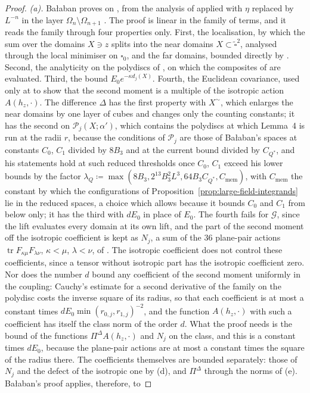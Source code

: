 \documentclass[11pt]{preprint}
\newcommand{\tr}{\operatorname{tr}}
\numberwithin{equation}{section}
\theoremstyle{definition}
\theoremstyle{remark}
\theoremstyle{plain}
\begin{document}
\begin{proof}
\emph{(a).} Ba{\l}aban proves \cite[(2.43)]{BalabanCRE} on \cite[pp.~279--283]{BalabanCRE}, from the analysis of \cite[Sects.~3--4]{BalabanRG1} applied with $\eta$ replaced by $L^{-n}$ in the layer $\Omega_n \setminus \Omega_{n+1}$ \cite[p.~276, ll.~2--16; p.~280, ll.~14--22]{BalabanCRE}. The proof is linear in the family of terms, and it reads the family through four properties only. First, the localisation, by which the sum over the domains $X \ni z$ splits into the near domains $X \subset \tilde\square^2$, analysed through the local minimiser on $\square_0$, and the far domains, bounded directly by \cite[(3.48)]{BalabanCRE} \cite[p.~280, ll.~3--6]{BalabanCRE}. Second, the analyticity on the polydiscs of \cite[(3.13)--(3.14), Lemma~4, p.~280]{BalabanRG1}, on which the composites of \cite[(3.30)--(3.31)]{BalabanRG1} are evaluated. Third, the bound $E_0e^{-\kappa d_j(X)}$. Fourth, the Euclidean covariance, used only at \cite[(3.60)--(3.61), p.~282]{BalabanCRE} to show that the second moment is a multiple of the isotropic action $A(h_z, \cdot)$. The difference $\Delta$ has the first property with $X^\sim$, which enlarges the near domains by one layer of cubes and changes only the counting constants; it has the second on $\mathcal P_j(X; \alpha')$, which contains the polydiscs at which Lemma~4 is run at the radii $r$, because the conditions of $\mathcal P_j$ are those of Ba{\l}aban's spaces at constants $C_0$, $C_1$ divided by $8B_3$ and at the current bound divided by $C_{Q^*}$, and his statements hold at such reduced thresholds once $C_0$, $C_1$ exceed his lower bounds by the factor $\lambda_Q \coloneqq \max(8B_3, 2^{13}B_3^2L^3, 64B_3C_{Q^*}, C_{\mathrm{mem}})$, with $C_{\mathrm{mem}}$ the constant by which the configurations of Proposition~\ref{prop:large-field-integrands} lie in the reduced spaces, a choice which \cite[(2.28), p.~259]{BalabanCRE} allows because it bounds $C_0$ and $C_1$ from below only; it has the third with $dE_0$ in place of $E_0$. The fourth fails for $\mathcal G$, since the lift evaluates every domain at its own lift, and the part of the second moment off the isotropic coefficient is kept as $N_j$, a sum of the $36$ plane-pair actions $\tr F_{\kappa\mu}F_{\lambda\nu}$, $\kappa < \mu$, $\lambda < \nu$, of \cite[(3.57)]{BalabanCRE}. The isotropic coefficient does not control these coefficients, since a tensor without isotropic part has the isotropic coefficient zero. Nor does the number $d$ bound any coefficient of the second moment uniformly in the coupling: Cauchy's estimate for a second derivative of the family on the polydisc costs the inverse square of its radius, so that each coefficient is at most a constant times $dE_0\min(r_{0,j}, r_{1,j})^{-2}$, and the function $A(h_z, \cdot)$ with such a coefficient has itself the class norm of the order $d$. What the proof needs is the bound of the functions $\Pi^\Delta A(h_z, \cdot)$ and $N_j$ on the class, and this is a constant times $dE_0$, because the plane-pair actions are at most a constant times the square of the radius there. The coefficients themselves are bounded separately: those of $N_j$ and the defect of the isotropic one by (d), and $\Pi^\Delta$ through the norms of (e). Ba{\l}aban's proof applies, therefore, to 
\end{proof}
\end{document}
